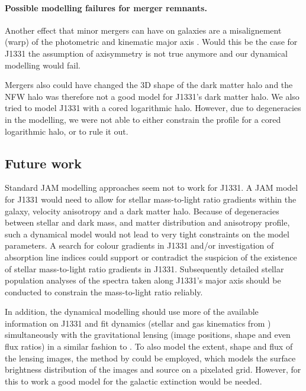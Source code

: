 \paragraph{Possible modelling failures for merger remnants.} Another effect that minor mergers can have on galaxies are a misalignement (warp) of the photometric and kinematic major axis \Wilma{[TO DO: REF]}. Would this be the case for J1331 the assumption of axisymmetry is not true anymore and our dynamical modelling would fail.

Mergers also could have changed the 3D shape of the dark matter halo and the NFW halo was therefore not a good model for J1331's dark matter halo. We also tried to model J1331 with a cored logarithmic halo. However, due to degeneracies in the modelling, we were not able to either constrain the profile for a cored logarithmic halo, or to rule it out. 



\subsection{Future work}

Standard JAM modelling approaches seem not to work for J1331. A JAM model for J1331 would need to allow for stellar mass-to-light ratio gradients within the galaxy, velocity anisotropy and a dark matter halo. Because of degeneracies between stellar and dark mass, and matter distribution and anisotropy profile, such a dynamical model would not lead to very tight constraints on the model parameters.  A search for colour gradients in J1331 and/or investigation of absorption line indices could support or contradict the suspicion of the existence of stellar mass-to-light ratio gradients in J1331. Subsequently detailed stellar population analyses of the spectra taken along J1331's major axis should be conducted to constrain the mass-to-light ratio reliably.  

In addition, the dynamical modelling should use more of the available information on J1331 and fit dynamics (stellar and gas kinematics from \citet{SWELLSV}) simultaneously with the gravitational lensing (image positions, shape and even flux ratios) in a similar fashion to \citet{SWELLSIV}. To also model the extent, shape and flux of the lensing images, the method by \citet{2004ApJ...611..739T,2003ApJ...590..673W} could be employed, which models the surface brightness distribution of the images and source on a pixelated grid. However, for this to work a good model for the galactic extinction would be needed. 

